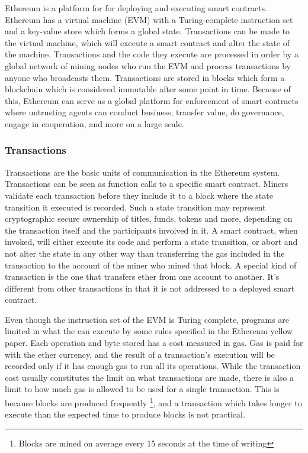 Ethereum \cite{wood2018ethereum} is a platform for for deploying and executing smart contracts. Ethereum has a virtual machine (EVM) with a Turing-complete instruction set and a key-value store which forms a global state. Transactions can be made to the virtual machine, which will execute a smart contract and alter the state of the machine. Transactions and the code they execute are processed in order by a global network of mining nodes who run the EVM and process transactions by anyone who broadcasts them. Transactions are stored in blocks which form a blockchain which is considered immutable after some point in time. Because of this, Ethereum can serve as a global platform for enforcement of smart contracts where untrusting agents can conduct business, transfer value, do governance, engage in cooperation, and more on a large scale.

\subsubsection{Transactions}
Transactions are the basic units of communication in the Ethereum system. Transactions can be seen as function calls to a specific smart contract. Miners validate each transaction before they include it to a block where the state transition it executed is recorded. Such a state transition may represent cryptographic secure ownership of titles, funds, tokens and more, depending on the transaction itself and the participants involved in it. A smart contract, when invoked, will either execute its code and perform a state transition, or abort and not alter the state in any other way than transferring the gas included in the transaction to the account of the miner who mined that block. A special kind of transaction is the one that transfers ether from one account to another. It's different from other transactions in that it is not addressed to a deployed smart contract.

Even though the instruction set of the EVM is Turing complete, programs are limited in what the can execute by some rules specified in the Ethereum yellow paper. Each operation and byte stored has a cost measured in gas. Gas is paid for with the ether currency, and the result of a transaction's execution will be recorded only if it has enough gas to run all its operations. While the transaction cost usually constitutes the limit on what transactions are made, there is also a limit to how much gas is allowed to be used for a single transaction. This is because blocks are produced frequently \footnote{Blocks are mined on average every 15 seconds at the time of writing}, and a transaction which takes longer to execute than the expected time to produce blocks is not practical. 

